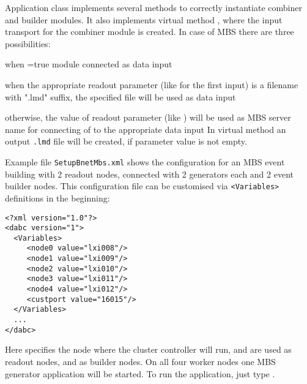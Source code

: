 Application class  implements several methods to
correctly instantiate combiner and builder modules.
It also implements virtual method , where the input transport 
for the combiner module is created. In case of MBS there are three possibilities:
\bnum
\item when =true module  connected as data input 
\item when the appropriate readout parameter (like  for the first input) 
is a filename with ".lmd" suffix, the specified file will be used as data input
\item otherwise, the value of readout parameter (like ) will be used as MBS server name for connecting of  to the appropriate data input         
\enum
In virtual method  an output {\tt\*.lmd} file will be created, if 
parameter  value is not empty.

Example file {\tt SetupBnetMbs.xml}
shows the configuration for an MBS event building with 2 readout nodes, connected with 2 generators each and 2 event builder nodes. 
This configuration file can be customised via {\tt <Variables>} definitions 
in the beginning:
\begin{small}
\begin{verbatim}
<?xml version="1.0"?>
<dabc version="1">
  <Variables>
     <node0 value="lxi008"/>
     <node1 value="lxi009"/>
     <node2 value="lxi010"/>
     <node3 value="lxi011"/>
     <node4 value="lxi012"/>
     <custport value="16015"/>
  </Variables>
  ...
</dabc>
\end{verbatim}
\end{small}

Here  specifies the node where the cluster controller will run,  and  are used as readout nodes,
 and  as builder nodes. On all four worker nodes one MBS generator
application will be started. To run the application, just type .  
